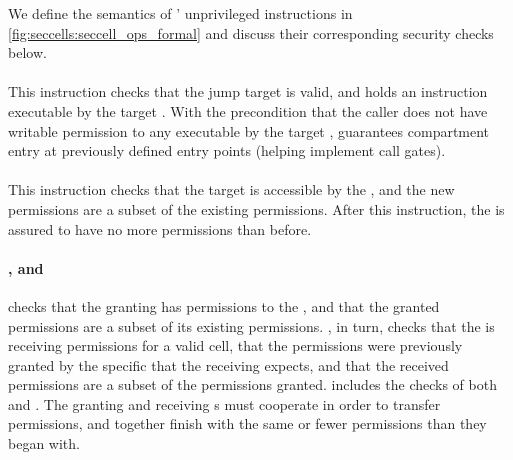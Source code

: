We define the semantics of \seccells' unprivileged instructions
in \autoref{fig:seccells:seccell_ops_formal} and discuss their corresponding
security checks below.

\paragraph{\sdswitch}
This instruction checks that the jump target is valid, and holds
an \sdentry instruction executable by the target \secdiv.
With the precondition that the caller \secdiv does not have
writable permission to any \cell executable by the target \secdiv,
\sdswitch guarantees compartment entry at previously defined entry 
points (helping implement call gates). 

\paragraph{\scprot}
This instruction checks that the target \cell is accessible by the
\secdiv, and the new permissions are a subset of the existing permissions.
After this instruction, the \secdiv is assured to have no more permissions
than before.

\paragraph{\scgrant, \screcv and \sctfer}
\scgrant checks that the granting \secdiv has permissions to the
\cell, and that the granted permissions are a subset of its existing
permissions.
\screcv, in turn, checks that the \secdiv is receiving permissions for a
valid cell, that the permissions were previously granted by the
specific \secdiv that the receiving \secdiv expects, and that the received
permissions are a subset of the permissions granted.
\sctfer includes the checks of both \scgrant and \scprot.
The granting and receiving \secdiv{}s must cooperate in order to
transfer permissions, and together finish with the same or fewer
permissions than they began with.

